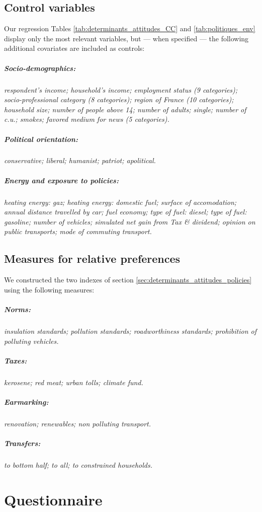 \documentclass[english,5p,authoryear]{elsarticle}
\begin{document}
\begin{appendices}
\subsection{Control variables\label{app:covariates}}

Our regression Tables \ref{tab:determinants_attitudes_CC} and \ref{tab:politiques_env} display only the most relevant variables, but --- when specified --- the following additional covariates are included as controls:

\subparagraph{Socio-demographics:} \textit{respondent's income; household's income; employment status \textnormal{(9 categories)}; socio-professional category \textnormal{(8 categories)}; region of France \textnormal{(10 categories)}; household size; number of people above 14; number of adults; single; number of c.u.; smokes; favored medium for news \textnormal{(5 categories)}.}

\subparagraph{Political orientation:} \textit{conservative; liberal; humanist; patriot; apolitical.}

\subparagraph{Energy and exposure to policies:} \textit{heating energy: gaz; heating energy: domestic fuel; surface of accomodation; annual distance travelled by car; fuel economy; type of fuel: diesel; type of fuel: gasoline; number of vehicles; simulated net gain from Tax \& dividend; opinion on public transports; mode of commuting transport.}

\subsection{Measures for relative preferences\label{app:measures}}

We constructed the two indexes of section \ref{sec:determinants_attitudes_policies} using the following measures:

\subparagraph{Norms:} \textit{insulation standards;  pollution standards; roadworthiness standards; prohibition of polluting vehicles.}

\subparagraph{Taxes:} \textit{kerosene; red meat; urban tolls; climate fund.}

\subparagraph{Earmarking:} \textit{renovation; renewables; non polluting transport.}

\subparagraph{Transfers:} \textit{to bottom half; to all; to constrained households.}

\section{Questionnaire\label{app:questionnaire}}


\end{appendices}
\end{document}

